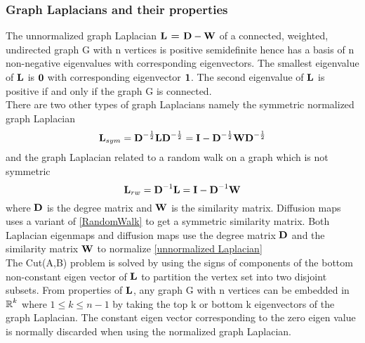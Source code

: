 \subsubsection{Graph Laplacians and their properties}
The unnormalized graph Laplacian $\textbf{L = D} - \textbf{W}$  of a connected, weighted,
undirected graph G with n vertices is positive semidefinite hence 
has a basis of n non-negative eigenvalues with corresponding  eigenvectors.
The smallest eigenvalue of $\textbf{L}$ is $\boldsymbol{0}$ with corresponding eigenvector $\boldsymbol{1}$. 
The second eigenvalue of $\textbf{L}$ is positive if and only if the graph G is connected.\\
There are two other types of graph Laplacians namely the symmetric normalized
graph Laplacian 
\begin{equation}\label{normalizedLaplacian}
\textbf{L}_{sym} = \textbf{D}^{-\frac{1}{2}} \textbf{L} \textbf{D}^{-\frac{1}{2}} =
\textbf{I} - \textbf{D}^{-\frac{1}{2}} \textbf{W} \textbf{D}^{-\frac{1}{2}}
\end{equation}
and 
the graph Laplacian related to a random walk on a graph which is not symmetric
\begin{equation}\label{RandomWalk}
\textbf{L}_{rw} = \textbf{D}^{-1}\textbf{L} = \textbf{I} - \textbf{D}^{-1}\textbf{W}
\end{equation}
where $\textbf{D}$ is the degree matrix and $\textbf{W}$ is the similarity matrix.
Diffusion maps uses a variant of \eqref{RandomWalk} to get a symmetric similarity
matrix. 
Both Laplacian eigenmaps and diffusion maps use the degree matrix $\textbf{D}$
and the similarity matrix $\textbf{W}$ to normalize \eqref{unnormalized Laplacian}\\

The Cut(A,B) problem is solved by using the signs of components of the bottom non-constant eigen vector of $\textbf{L}$ to partition the vertex set into two disjoint subsets\cite{Luxburg2007}.
From properties of $\textbf{L}$, any graph G with n vertices can be embedded in $\operatorname{\mathbb{R}}^{k}$ where $1 \leq k \leq n-1$ by taking the top k or bottom k eigenvectors of the graph Laplacian.
The constant eigen vector corresponding to the zero eigen value is normally
discarded when using the normalized graph Laplacian.




